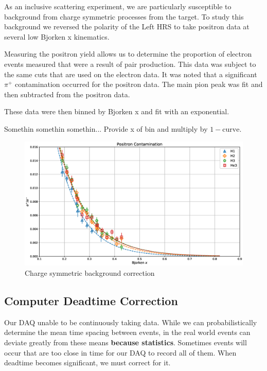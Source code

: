 As an inclusive scattering experiment, we are particularly susceptible to background from charge symmetric processes from the target. To study this background we reversed the polarity of the Left HRS to take positron data at several low Bjorken x kinematics.

Measuring the positron yield allows us to determine the proportion of electron events measured that were a result of pair production. This data was subject to the same cuts that are used on the electron data. It was noted that a significant $\pi^+$ contamination occurred for the positron data. The main pion peak was fit and then subtracted from the positron data.

These data were then binned by Bjorken x and fit with an exponential. 

Somethin somethin somethin... Provide x of bin and multiply by $1-\mathrm{curve}$.

\begin{figure}
	\includegraphics[width=\textwidth]{./analysis/fig/positrons.eps}
	\caption{Charge symmetric background correction}
	\label{fig:positrons}
\end{figure}

\subsection{Computer Deadtime Correction}

Our DAQ unable to be continuously taking data. While we can probabilistically determine the mean time spacing between events, in the real world events can deviate greatly from these means \textbf{because statistics}. Sometimes events will occur that are too close in time for our DAQ to record all of them. When deadtime becomes significant, we must correct for it.

